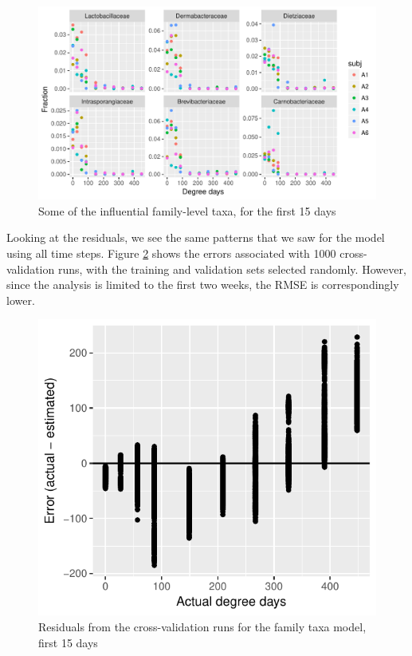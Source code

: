 \documentclass{article}
\begin{document}
\begin{figure}
  \centering
  \includegraphics{../../only_families/first_two_weeks/influential_family_taxa_panel_first_two_weeks}
  \caption{Some of the influential family-level taxa, for the first 15 days}
  \label{fig:scatter_family_taxa_first_15days}
\end{figure}

Looking at the residuals, we see the same patterns that we saw for the
model using all time steps.  Figure
\ref{fig:resids_cv_first_15days_family_taxa} shows the errors
associated with 1000 cross-validation runs, with the training and
validation sets selected randomly.  However, since the analysis is
limited to the first two weeks, the RMSE is correspondingly lower.

\begin{figure}
  \centering
  \includegraphics{../../only_families/first_two_weeks/hit_1perc_twice/orig_units_first_two_weeks_families_residuals}
  \caption{Residuals from the cross-validation runs for the family taxa model, first 15 days}
  \label{fig:resids_cv_first_15days_family_taxa}
\end{figure}
\end{document}
